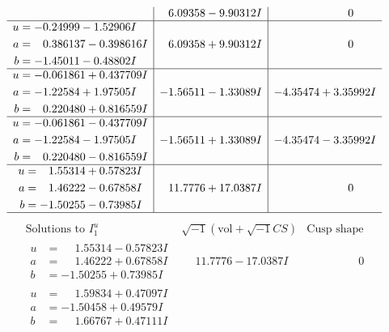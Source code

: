 \documentclass[1p]{elsarticle_modified}
\theoremstyle{definition}
\newcommand{\I}{\sqrt{-1}}
\begin{document}
$$\begin{array}{c|c|c}
 & \phantom{-}6.09358 - 9.90312 I & \phantom{-0.000000 } 0 \\ \hline\begin{aligned}
u &= -0.24999 - 1.52906 I \\
a &= \phantom{-}0.386137 - 0.398616 I \\
b &= -1.45011 - 0.48802 I\end{aligned}
 & \phantom{-}6.09358 + 9.90312 I & \phantom{-0.000000 } 0 \\ \hline\begin{aligned}
u &= -0.061861 + 0.437709 I \\
a &= -1.22584 + 1.97505 I \\
b &= \phantom{-}0.220480 + 0.816559 I\end{aligned}
 & -1.56511 - 1.33089 I & -4.35474 + 3.35992 I \\ \hline\begin{aligned}
u &= -0.061861 - 0.437709 I \\
a &= -1.22584 - 1.97505 I \\
b &= \phantom{-}0.220480 - 0.816559 I\end{aligned}
 & -1.56511 + 1.33089 I & -4.35474 - 3.35992 I \\ \hline\begin{aligned}
u &= \phantom{-}1.55314 + 0.57823 I \\
a &= \phantom{-}1.46222 - 0.67858 I \\
b &= -1.50255 - 0.73985 I\end{aligned}
 & \phantom{-}11.7776 + 17.0387 I & \phantom{-0.000000 } 0\\
 \hline 
 \end{array}$$\newpage$$\begin{array}{c|c|c}  
\text{Solutions to }I^u_{1}& \I (\text{vol} + \sqrt{-1}CS) & \text{Cusp shape}\\
 \hline 
\begin{aligned}
u &= \phantom{-}1.55314 - 0.57823 I \\
a &= \phantom{-}1.46222 + 0.67858 I \\
b &= -1.50255 + 0.73985 I\end{aligned}
 & \phantom{-}11.7776 - 17.0387 I & \phantom{-0.000000 } 0 \\ \hline\begin{aligned}
u &= \phantom{-}1.59834 + 0.47097 I \\
a &= -1.50458 + 0.49579 I \\
b &= \phantom{-}1.66767 + 0.47111 I\end{aligned}

\end{array}$$
\end{document}
